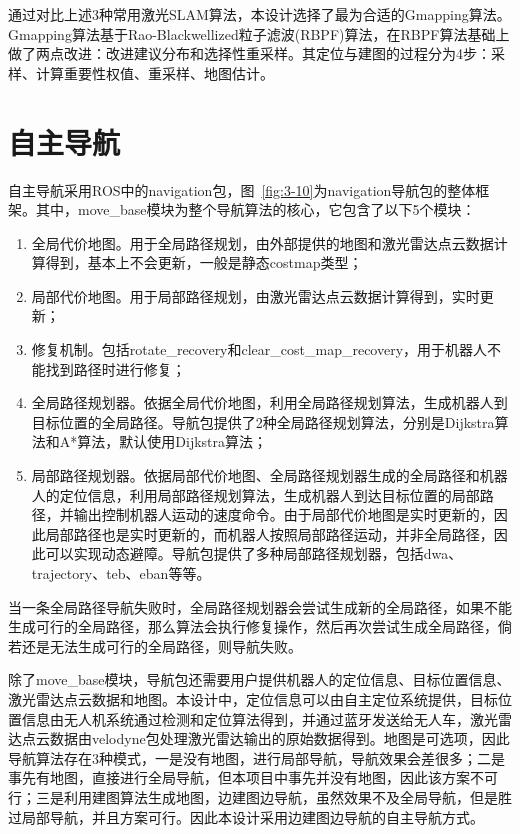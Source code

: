 通过对比上述3种常用激光SLAM算法，本设计选择了最为合适的Gmapping算法。Gmapping算法基于Rao-Blackwellized粒子滤波(RBPF)算法，在RBPF算法基础上做了两点改进：改进建议分布和选择性重采样。其定位与建图的过程分为4步：采样、计算重要性权值、重采样、地图估计。

\section{自主导航}
自主导航采用ROS中的navigation包，图~\ref{fig:3-10}为navigation导航包的整体框架。其中，move\_base模块为整个导航算法的核心，它包含了以下5个模块：

\begin{enumerate}[label=(\arabic*)] 
	\item 全局代价地图。用于全局路径规划，由外部提供的地图和激光雷达点云数据计算得到，基本上不会更新，一般是静态costmap类型；
	\item 局部代价地图。用于局部路径规划，由激光雷达点云数据计算得到，实时更新；
	\item 修复机制。包括rotate\_recovery和clear\_cost\_map\_recovery，用于机器人不能找到路径时进行修复；
	\item 全局路径规划器。依据全局代价地图，利用全局路径规划算法，生成机器人到目标位置的全局路径。导航包提供了2种全局路径规划算法，分别是Dijkstra算法和A*算法，默认使用Dijkstra算法；
	\item 局部路径规划器。依据局部代价地图、全局路径规划器生成的全局路径和机器人的定位信息，利用局部路径规划算法，生成机器人到达目标位置的局部路径，并输出控制机器人运动的速度命令。由于局部代价地图是实时更新的，因此局部路径也是实时更新的，而机器人按照局部路径运动，并非全局路径，因此可以实现动态避障。导航包提供了多种局部路径规划器，包括dwa、trajectory、teb、eban等等。
\end{enumerate}

当一条全局路径导航失败时，全局路径规划器会尝试生成新的全局路径，如果不能生成可行的全局路径，那么算法会执行修复操作，然后再次尝试生成全局路径，倘若还是无法生成可行的全局路径，则导航失败。

除了move\_base模块，导航包还需要用户提供机器人的定位信息、目标位置信息、激光雷达点云数据和地图。本设计中，定位信息可以由自主定位系统提供，目标位置信息由无人机系统通过检测和定位算法得到，并通过蓝牙发送给无人车，激光雷达点云数据由velodyne包处理激光雷达输出的原始数据得到。地图是可选项，因此导航算法存在3种模式，一是没有地图，进行局部导航，导航效果会差很多；二是事先有地图，直接进行全局导航，但本项目中事先并没有地图，因此该方案不可行；三是利用建图算法生成地图，边建图边导航，虽然效果不及全局导航，但是胜过局部导航，并且方案可行。因此本设计采用边建图边导航的自主导航方式。

